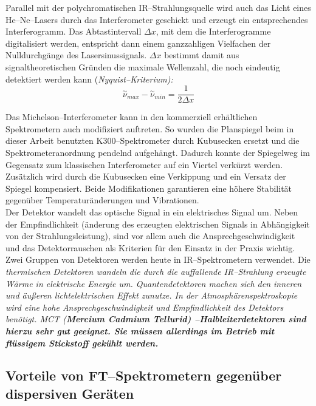 Parallel mit der polychromatischen IR--Strahlungsquelle wird auch
das Licht eines He--Ne--Lasers durch das Interferometer geschickt
und erzeugt ein entsprechendes Interferogramm. Das Abtastintervall
$\Delta x$, mit dem die Interferogramme digitalisiert werden,
entspricht dann einem ganzzahligen Vielfachen der Nulldurchgänge
des Lasersinussignals. $\Delta x$ bestimmt damit aus
signaltheoretischen Gründen die maximale Wellenzahl, die noch
eindeutig detektiert werden kann (\it Nyquist--Kriterium\rm ):
\begin{equation}\label{eqnyquist}
  \stackrel{\sim}{\nu}_{max}-\stackrel{\sim}{\nu}_{min} = \frac{1}{2\Delta
  x}
\end{equation}

Das Michelson--Interferometer kann in den kommerziell erhältlichen
Spektrometern auch modifiziert auftreten. So wurden die
Planspiegel beim in dieser Arbeit benutzten K300--Spektrometer
durch Kubusecken ersetzt und die Spektrometeranordnung pendelnd
aufgehängt. Dadurch konnte der Spiegelweg im Gegensatz zum
klassischen Interferometer auf ein Viertel verkürzt werden.
Zusätzlich wird durch die Kubusecken eine Verkippung und ein
Versatz der Spiegel kompensiert. Beide Modifikationen garantieren
eine höhere Stabilität gegenüber Temperaturänderungen und
Vibrationen.\\

Der Detektor wandelt das optische Signal in ein elektrisches
Signal um. Neben der Empfindlichkeit (änderung des erzeugten
elektrischen Signals in Abhängigkeit von der Strahlungsleistung),
sind vor allem auch die Ansprechgeschwindigkeit und das
Detektorrauschen als Kriterien für den Einsatz in der Praxis
wichtig. Zwei Gruppen von Detektoren werden heute in
IR--Spektrometern verwendet. Die \it thermischen Detektoren \rm
wandeln die durch die auffallende IR--Strahlung erzeugte Wärme in
elektrische Energie um. \it Quantendetektoren \rm machen sich den
inneren und äu{\ss}eren lichtelektrischen Effekt zunutze. In der
Atmosphärenspektroskopie wird eine hohe Ansprechgeschwindigkeit
und Empfindlichkeit des Detektors benötigt. MCT (\bf M\rm ercium
\bf C\rm admium \bf T\rm ellurid) --Halbleiterdetektoren sind
hierzu sehr gut geeignet. Sie müssen allerdings im Betrieb mit
flüssigem Stickstoff gekühlt werden.\\


\subsection{\label{vorteile}Vorteile von FT--Spektrometern gegenüber dispersiven
Geräten}

